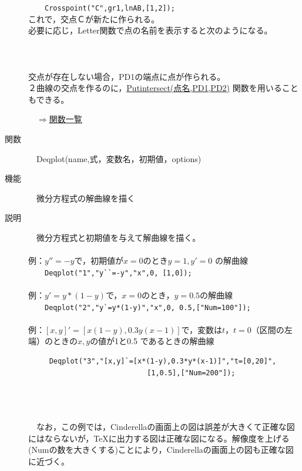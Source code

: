 \documentclass[papersize,a4paper,12pt,uplatex]{jsarticle}
\begin{document}
\begin{description}
　　\verb|Crosspoint("C",gr1,lnAB,[1,2]);|\\

これで，交点Ｃが新たに作られる。\\
必要に応じ，Letter関数で点の名前を表示すると次のようになる。\\
\\
　　　　　　　　\\
　\\
交点が存在しない場合，PD1の端点に点が作られる。\\
２曲線の交点を作るのに，\hyperlink{putintersect}{Putintersect(点名,PD1,PD2)} 関数を用いることもできる。\\
\begin{flushright}　\hyperlink{functionlist}{$\Rightarrow$関数一覧}\end{flushright}
\hypertarget{deqplot}{}
\item[関数]　Deqplot(name,式，変数名，初期値，options)
\item[機能]　微分方程式の解曲線を描く
\item[説明]　微分方程式と初期値を与えて解曲線を描く。\\
　\\
例：$y''=-y$で，初期値が$x=0$のとき$y=1,y'=0$ の解曲線\\

　　\verb|Deqplot("1","y``=-y","x",0, [1,0]); |\\

　　　　　　　\\

例：$y'=y*(1-y)$で，$x=0$のとき，$y=0.5$の解曲線\\

　　\verb|Deqplot("2","y`=y*(1-y)","x",0, 0.5,["Num=100"]);| \\

　　　　　　　\\

例：$[x,y]'=[x(1-y),0.3y(x-1)]$で，変数は$t$，$t=0$（区間の左端）のときの$x, y$の値が1と0.5 であるときの解曲線
\begin{verbatim}
　　　Deqplot("3","[x,y]`=[x*(1-y),0.3*y*(x-1)]","t=[0,20]",
　　　　　　　　　　　　　　　　　[1,0.5],["Num=200"]);
\end{verbatim} 
　\\
　　　　　　　\\
　\\
　なお，この例では，Cinderellaの画面上の図は誤差が大きくて正確な図にはならないが，\TeX に出力する図は正確な図になる。解像度を上げる(Numの数を大きくする)ことにより，Cinderellaの画面上の図も正確な図に近づく。\\


\end{description}
\end{document}
